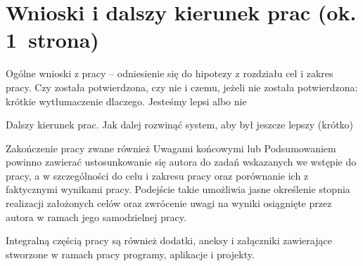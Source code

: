 
\chapter{Wnioski i dalszy kierunek prac (ok. 1~strona)}

Ogólne wnioski z pracy – odniesienie się do hipotezy z rozdziału cel i zakres pracy. Czy została potwierdzona, czy nie i czemu, jeżeli nie została potwierdzona: krótkie wytłumaczenie dlaczego. Jesteśmy lepsi albo nie

Dalszy kierunek prac. Jak dalej rozwinąć system, aby był jeszcze lepszy (krótko)

Zakończenie pracy zwane również Uwagami końcowymi lub Podsumowaniem powinno zawierać ustosunkowanie
się autora do zadań wskazanych we wstępie do pracy, a w szczególności do celu i zakresu pracy oraz
porównanie ich z faktycznymi wynikami pracy. Podejście takie umożliwia jasne określenie stopnia
realizacji założonych celów oraz zwrócenie uwagi na wyniki osiągnięte przez autora w ramach jego
samodzielnej pracy.

Integralną częścią pracy są również dodatki, aneksy i załączniki zawierające stworzone w ramach pracy programy, aplikacje i projekty.

